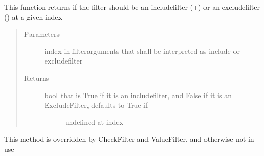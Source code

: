 \documentclass[a4paper,10pt,english]{sphinxmanual}
\begin{document}
\begin{fulllineitems}
\begin{fulllineitems}
\begin{quote}
\begin{description}
\begin{itemize}
\end{itemize}

\end{description}\end{quote}

\end{fulllineitems}


\begin{fulllineitems}
\label{\detokenize{fagus.filters:fagus.filters.FilBase.included}}
\pysigstartsignatures
{}
\pysigstopsignatures
\sphinxAtStartPar
This function returns if the filter should be an include\sphinxhyphen{}filter (+) or an exclude\sphinxhyphen{}filter (\sphinxhyphen{}) at a given index
\begin{quote}\begin{description}
\item[{Parameters}] \leavevmode
\sphinxAtStartPar
{} \textendash{} index in filter\sphinxhyphen{}arguments that shall be interpreted as include\sphinxhyphen{} or exclude\sphinxhyphen{}filter

\item[{Returns}] \leavevmode
\sphinxAtStartPar
\begin{description}
\item[{bool that is True if it is an include\sphinxhyphen{}filter, and False if it is an Exclude\sphinxhyphen{}Filter, defaults to True if}] \leavevmode
\sphinxAtStartPar
undefined at index

\end{description}


\end{description}\end{quote}

\end{fulllineitems}


\begin{fulllineitems}
\label{\detokenize{fagus.filters:fagus.filters.FilBase.match_node}}
\pysigstartsignatures
{}
\pysigstopsignatures
\sphinxAtStartPar
This method is overridden by CheckFilter and ValueFilter, and otherwise not in use


\end{fulllineitems}
\end{fulllineitems}
\end{document}
